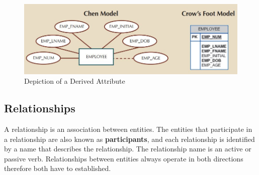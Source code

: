 \documentclass[a4paper, 12pt, titlepage]{report}
\begin{document}
{\begin{figure}[H]
\centering
\includegraphics[scale=0.5]{Attr5}
\caption{Depiction of a Derived Attribute}
\end{figure}

%

\subsection{Relationships}
A relationship is an association between entities. The entities that participate in a relationship are also known as \textbf{participants}, and each relationship is identified by a name that describes the relationship. The relationship name is an active or passive verb. Relationships between entities always operate in both directions therefore both have to established.

}
\end{document}
